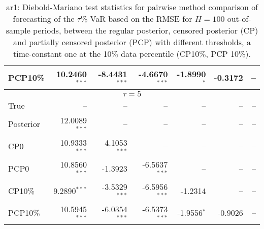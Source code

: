 {{\begin{table}
\begin{tabular}{l | rrrrrr}
PCP10\% & 10.2460$^{***}$ & -8.4431$^{***}$ & -4.6670$^{***}$ & -1.8990$^{*}$\phantom{$^{**}$} & -0.3172\phantom{$^{***}$} &    --\phantom{$^{***}$}   \\ 
\hline 
\multicolumn{7}{c}{$\tau = 5$} \\ \hline 
True &    --\phantom{$^{***}$} &    --\phantom{$^{***}$} &    --\phantom{$^{***}$} &    --\phantom{$^{***}$} &    --\phantom{$^{***}$} &    --\phantom{$^{***}$}   \\ 
Posterior & 12.0089$^{***}$ &    --\phantom{$^{***}$} &    --\phantom{$^{***}$} &    --\phantom{$^{***}$} &    --\phantom{$^{***}$} &    --\phantom{$^{***}$}   \\ 
CP0 & 10.9333$^{***}$ & 4.1053$^{***}$ &    --\phantom{$^{***}$} &    --\phantom{$^{***}$} &    --\phantom{$^{***}$} &    --\phantom{$^{***}$}   \\ 
PCP0 & 10.8560$^{***}$ & -1.3923\phantom{$^{***}$} & -6.5637$^{***}$ &    --\phantom{$^{***}$} &    --\phantom{$^{***}$} &    --\phantom{$^{***}$}   \\ 
CP10\% & 9.2890$^{***}$ & -3.5329$^{***}$ & -6.5956$^{***}$ & -1.2314\phantom{$^{***}$} &    --\phantom{$^{***}$} &    --\phantom{$^{***}$}   \\ 
PCP10\% & 10.5945$^{***}$ & -6.0354$^{***}$ & -6.5373$^{***}$ & -1.9556$^{*}$\phantom{$^{**}$} & -0.9026\phantom{$^{***}$} &    --\phantom{$^{***}$}   \\ 
\hline 
\end{tabular}
 \caption{ar1: Diebold-Mariano test statistics for pairwise method comparison  of forecasting of the $\tau$\%  VaR  based on  the RMSE for $H=100$ out-of-sample periods,  between  the regular posterior, censored posterior (CP) and  partially censored posterior (PCP) with different thresholds,  a time-constant one at the 10\% data percentile (CP10\%, PCP 10\%). }
\label{tab:ar1_DM__T100}  
\end{table}
}}